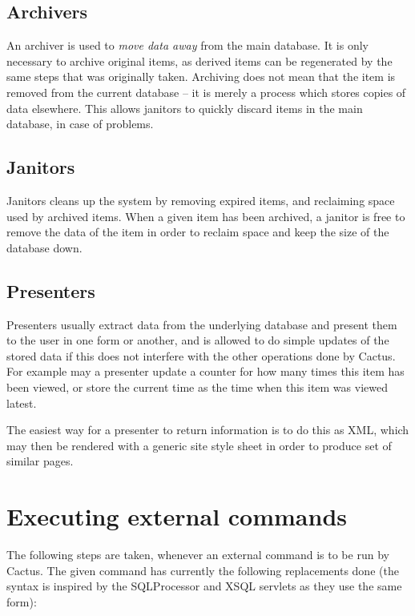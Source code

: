 \subsection{Archivers}

An archiver is used to \textit{move data away} from the main database.
It is only necessary to archive original items, as derived items can
be regenerated by the same steps that was originally taken.  Archiving
does not mean that the item is removed from the current database -- it
is merely a process which stores copies of data elsewhere.  This
allows janitors to quickly discard items in the main database, in case
of problems.


\subsection{Janitors}

Janitors cleans up the system by removing expired items, and
reclaiming space used by archived items.  When a given item has been
archived, a janitor is free to remove the data of the item in order to
reclaim space and keep the size of the database down.

\subsection{Presenters}

Presenters usually extract data from the underlying database and
present them to the user in one form or another, and is allowed to do
simple updates of the stored data if this does not interfere with the
other operations done by Cactus.  For example may a presenter update a
counter for how many times this item has been viewed, or store the
current time as the time when this item was viewed latest.

The easiest way for a presenter to return information is to do this
as XML, which may then be rendered with a generic site style sheet in
order to produce set of similar pages.  

\section{Executing external commands}

The following steps are taken, whenever an external command is to be
run by Cactus.  The given command has currently the following
replacements done (the syntax is inspired by the SQLProcessor and XSQL
servlets as they use the same form):


